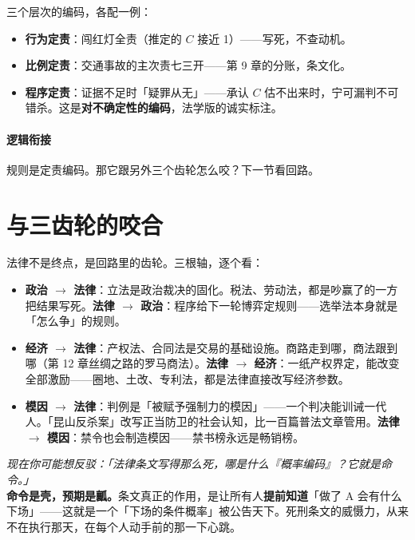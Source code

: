 \documentclass[../../main2.tex]{subfiles}
\begin{document}
三个层次的编码，各配一例：

\begin{itemize}
	\item \textbf{行为定责}：闯红灯全责（推定的 $C$ 接近 1）——写死，不查动机。
	\item \textbf{比例定责}：交通事故的主次责七三开——第 9 章的分账，条文化。
	\item \textbf{程序定责}：证据不足时「疑罪从无」——承认 $C$ 估不出来时，宁可漏判不可错杀。这是\textbf{对不确定性的编码}，法学版的诚实标注。
\end{itemize}

\paragraph*{逻辑衔接}
	规则是定责编码。那它跟另外三个齿轮怎么咬？下一节看回路。

\section{与三齿轮的咬合}

法律不是终点，是回路里的齿轮。三根轴，逐个看：

\begin{itemize}
	\item \textbf{政治 $\rightarrow$ 法律}：立法是政治裁决的固化。税法、劳动法，都是吵赢了的一方把结果写死。\textbf{法律 $\rightarrow$ 政治}：程序给下一轮博弈定规则——选举法本身就是「怎么争」的规则。
	\item \textbf{经济 $\rightarrow$ 法律}：产权法、合同法是交易的基础设施。商路走到哪，商法跟到哪（第 12 章丝绸之路的罗马商法）。\textbf{法律 $\rightarrow$ 经济}：一纸产权界定，能改变全部激励——圈地、土改、专利法，都是法律直接改写经济参数。
	\item \textbf{模因 $\rightarrow$ 法律}：判例是「被赋予强制力的模因」——一个判决能训诫一代人。「昆山反杀案」改写正当防卫的社会认知，比一百篇普法文章管用。\textbf{法律 $\rightarrow$ 模因}：禁令也会制造模因——禁书榜永远是畅销榜。
\end{itemize}

\begin{questionbox}
	\textit{现在你可能想反驳：「法律条文写得那么死，哪是什么『概率编码』？它就是命令。」}\\
	\textbf{命令是壳，预期是瓤。}条文真正的作用，是让所有人\textbf{提前知道}「做了 A 会有什么下场」——这就是一个「下场的条件概率」被公告天下。死刑条文的威慑力，从来不在执行那天，在每个人动手前的那一下心跳。
\end{questionbox}
\end{document}
